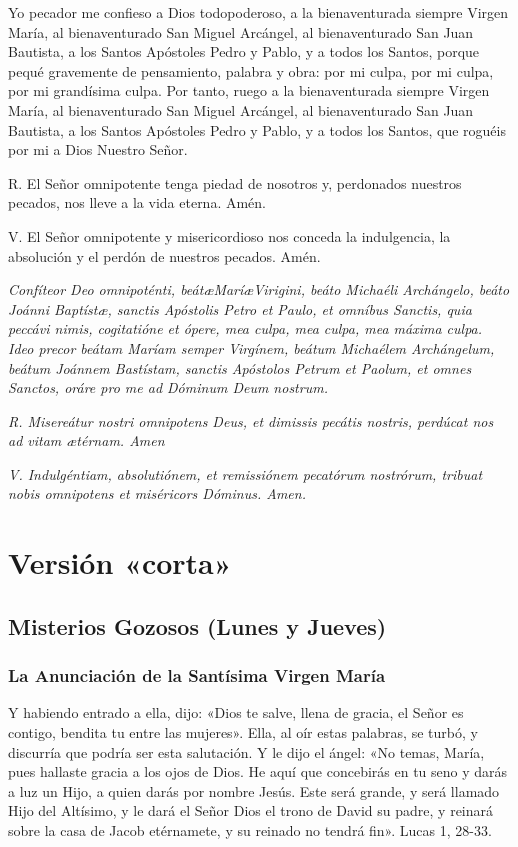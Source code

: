 \documentclass[a4paper,11pt, oneside]{report}
\begin{document}
    Yo pecador me confieso a Dios todopoderoso, a la bienaventurada siempre Virgen María, al bienaventurado San Miguel Arcángel,
    al bienaventurado San Juan Bautista, a los Santos Apóstoles Pedro y Pablo, y a todos los Santos, porque pequé gravemente de 
    pensamiento, palabra y obra: por mi culpa, por mi culpa, por mi grandísima culpa. Por tanto, ruego a la bienaventurada siempre
    Virgen María, al bienaventurado San Miguel Arcángel, al bienaventurado San Juan Bautista, a los Santos Apóstoles Pedro y Pablo,
    y a todos los Santos, que roguéis por mi a Dios Nuestro Señor.\par\smallbreak{}
    R. El Señor omnipotente tenga piedad de nosotros y, perdonados nuestros pecados, nos lleve a la vida eterna. Amén.\par\smallbreak{}
    V. El Señor omnipotente y misericordioso nos conceda la indulgencia, la absolución y el perdón de nuestros pecados. Amén.

    \medskip

    \textit{Confíteor Deo omnipoténti, beát\ae Marí\ae Virigini, beáto Michaéli Archángelo, beáto Joánni Baptíst\ae, sanctis Apóstolis
    Petro et Paulo, et omníbus Sanctis, quia peccávi nimis, cogitatióne et ópere, mea culpa, mea culpa, mea máxima culpa. Ideo precor
    beátam Maríam semper Virgínem, beátum Michaélem Archángelum, beátum Joánnem Bastístam, sanctis Apóstolos Petrum et Paolum, et omnes
    Sanctos, oráre pro me ad Dóminum Deum nostrum.}\par\smallbreak{}
    \textit{R. Misereátur nostri omnipotens Deus, et dimissis pecátis nostris, perdúcat nos ad vitam {\ae}térnam. Amen}\par\smallbreak{}
    \textit{V. Indulgéntiam, absolutiónem, et remissiónem pecatórum nostrórum, tribuat nobis omnipotens et miséricors Dóminus. Amen.}
    
  \chapter*{Versión «corta»}

    \section*{Misterios Gozosos (Lunes y Jueves)}
      
      \subsection*{La Anunciación de la Santísima Virgen María}
        Y habiendo entrado a ella, dijo: «Dios te salve, llena de gracia, el Señor es contigo, bendita tu entre las mujeres». Ella, al oír estas palabras, se turbó,
        y discurría que podría ser esta salutación. Y le dijo el ángel: «No temas, María, pues hallaste gracia a los ojos de Dios. He aquí que concebirás en tu seno
        y darás a luz un Hijo, a quien darás por nombre Jesús. Este será grande, y será llamado Hijo del Altísimo, y le dará el Señor Dios el trono de David su padre,
        y reinará sobre la casa de Jacob etérnamete, y su reinado no tendrá fin». Lucas 1, 28-33.
        
\end{document}
